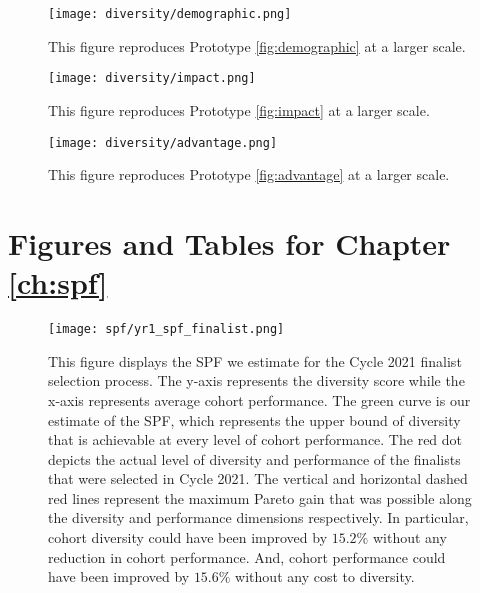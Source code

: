 \begin{figure}[!hbtp]
    \centering
    \texttt{[image: diversity/demographic.png]}
    \caption{This figure reproduces Prototype \ref{fig:demographic} at a larger scale.}
    \label{fig:demographic_full}
\end{figure}

\begin{figure}[!hbtp]
    \centering
    \texttt{[image: diversity/impact.png]}
    \caption{This figure reproduces Prototype \ref{fig:impact} at a larger scale.}
    \label{fig:impact_full}
\end{figure}

\begin{figure}[!hbtp]
    \centering
    \texttt{[image: diversity/advantage.png]}
    \caption{This figure reproduces Prototype \ref{fig:advantage} at a larger scale.}
    \label{fig:advantage_full}
\end{figure}


\section{Figures and Tables for Chapter \ref{ch:spf}}\label{app:spffigures}
\begin{figure}[!hbtp]
    \centering
        \caption{This figure displays the SPF we estimate for the Cycle 2021 finalist selection process. The y-axis represents the diversity score while the x-axis represents average cohort performance. The green curve is our estimate of the SPF, which represents the upper bound of diversity that is achievable at every level of cohort performance. The red dot depicts the actual level of diversity and performance of the finalists that were selected in Cycle 2021. The vertical and horizontal dashed red lines represent the maximum Pareto gain that was possible along the diversity and performance dimensions respectively. In particular, cohort diversity could have been improved by $15.2\%$ without any reduction in cohort performance. And, cohort performance could have been improved by $15.6\%$ without any cost to diversity.}
        \label{fig:spf_2021_full}
      \texttt{[image: spf/yr1\_spf\_finalist.png]} 
\end{figure}
    
